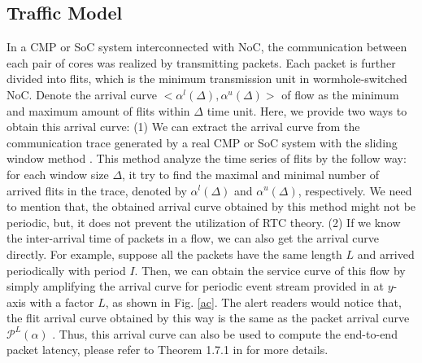 \documentclass[10pt,journal]{IEEEtran}
\begin{document}
\subsection{Traffic Model}\label{traffic}
In a CMP or SoC system interconnected with NoC, the communication between each pair of cores was realized by transmitting packets. Each packet is further divided into flits, which is the minimum transmission unit in wormhole-switched NoC. Denote the arrival curve $<\alpha^l(\Delta),\alpha^u(\Delta)>$ of flow as the minimum and maximum amount of flits within $\Delta$ time unit. Here, we provide two ways to obtain this arrival curve: (1) We can extract the arrival curve from the communication trace generated by a real CMP or SoC system with the sliding window method \cite{1253607}. This method analyze the time series of flits by the follow way: for each window size $\Delta$, it try to find the maximal and minimal number of arrived flits in the trace, denoted by $\alpha^l(\Delta)$ and $\alpha^u(\Delta)$, respectively. We need to mention that, the obtained arrival curve obtained by this method might not be periodic, but, it does not prevent the utilization of RTC theory. (2) If we know the inter-arrival time of packets in a flow, we can also get the arrival curve directly. For example, suppose all the packets have the same length $L$ and arrived periodically with period $I$. Then, we can obtain the service curve of this flow by simply amplifying the arrival curve for periodic event stream provided in \cite{1253607} at $y$-axis with a factor $L$, as shown in Fig. \ref{ac}. The alert readers would notice that, the flit arrival curve obtained by this way is the same as the packet arrival curve $\mathcal{P}^L(\alpha)$ \cite{Boudec2001Network}. Thus, this arrival curve can also be used to compute the end-to-end packet latency, please refer to Theorem 1.7.1 in \cite{Boudec2001Network} for more details.
\end{document}

